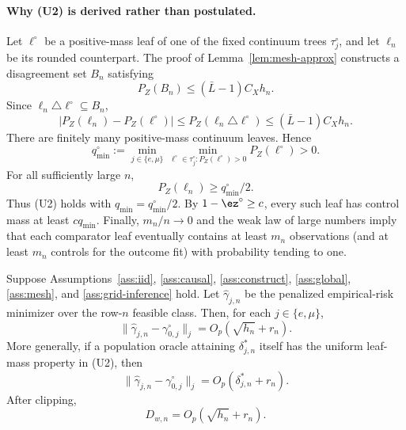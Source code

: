 \paragraph{Why (U2) is derived rather than postulated.}
Let $\ell^\circ$ be a positive-mass leaf of one of the fixed continuum trees
$\tau_j^\circ$, and let $\ell_n$ be its rounded counterpart.  The proof of
Lemma~\ref{lem:mesh-approx} constructs a disagreement set $B_n$ satisfying
\[
  P_Z(B_n)\le(\bar L-1)C_Xh_n.
\]
Since $\ell_n\triangle\ell^\circ\subseteq B_n$,
\[
  |P_Z(\ell_n)-P_Z(\ell^\circ)|
  \le P_Z(\ell_n\triangle\ell^\circ)
  \le(\bar L-1)C_Xh_n.
\]
There are finitely many positive-mass continuum leaves.  Hence
\[
  q^\circ_{\min}
  :=\min_{j\in\{e,\mu\}}
    \min_{\ell^\circ\in\tau_j^\circ:P_Z(\ell^\circ)>0}
       P_Z(\ell^\circ)>0.
\]
For all sufficiently large $n$,
\[
  P_Z(\ell_n)\ge q^\circ_{\min}/2.
\]
Thus (U2) holds with $q_{\min}=q^\circ_{\min}/2$.  By
$1-\ez^\circ\ge c$, every such leaf has control mass at least
$cq_{\min}$.  Finally, $m_n/n\to0$ and the weak law of large numbers imply
that each comparator leaf eventually contains at least $m_n$ observations
(and at least $m_n$ controls for the outcome fit) with probability tending
to one.

\begin{lemma}
\label{lem:grid-oracle}
Suppose Assumptions~\ref{ass:iid}, \ref{ass:causal},
\ref{ass:construct}, \ref{ass:global}, \ref{ass:mesh}, and
\ref{ass:grid-inference} hold.  Let $\widehat\gamma_{j,n}$ be the penalized
empirical-risk minimizer over the row-$n$ feasible class.  Then, for each
$j\in\{e,\mu\}$,
\begin{equation}\label{eq:grid-oracle}
  \|\widehat\gamma_{j,n}-\gamma_{0,j}^\circ\|_j
  =O_p\!\left(\sqrt{h_n}+r_n\right).
\end{equation}
More generally, if a population oracle attaining $\delta^*_{j,n}$ itself
has the uniform leaf-mass property in (U2), then
\[
  \|\widehat\gamma_{j,n}-\gamma_{0,j}^\circ\|_j
  =O_p(\delta^*_{j,n}+r_n).
\]
After clipping,
\begin{equation}\label{eq:grid-weight-oracle}
  D_{w,n}=O_p(\sqrt{h_n}+r_n).
\end{equation}
\end{lemma}

